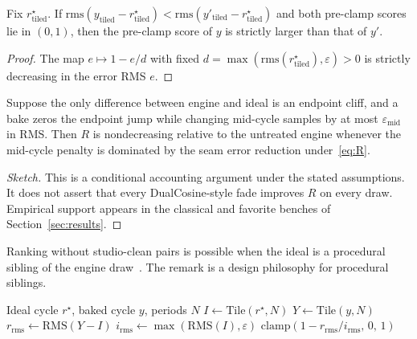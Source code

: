 \begin{proposition}
\label{prop:monotone}
Fix $r^{\star}_{\mathrm{tiled}}$. If $\mathrm{rms}(y_{\mathrm{tiled}}-r^{\star}_{\mathrm{tiled}})<\mathrm{rms}(y'_{\mathrm{tiled}}-r^{\star}_{\mathrm{tiled}})$ and both pre-clamp scores lie in $(0,1)$, then the pre-clamp score of $y$ is strictly larger than that of $y'$.
\end{proposition}
\begin{proof}
The map $e\mapsto 1-e/d$ with fixed $d=\max(\mathrm{rms}(r^{\star}_{\mathrm{tiled}}),\varepsilon)>0$ is strictly decreasing in the error RMS $e$.
\end{proof}

\begin{lemma}
\label{lem:wrap}
Suppose the only difference between engine and ideal is an endpoint cliff, and a bake zeros the endpoint jump while changing mid-cycle samples by at most $\varepsilon_{\mathrm{mid}}$ in RMS.
Then $R$ is nondecreasing relative to the untreated engine whenever the mid-cycle penalty is dominated by the seam error reduction under~\eqref{eq:R}.
\end{lemma}
\begin{proof}[Sketch]
This is a conditional accounting argument under the stated assumptions.
It does not assert that every DualCosine-style fade improves $R$ on every draw.
Empirical support appears in the classical and favorite benches of Section~\ref{sec:results}.
\end{proof}

\begin{remark}
\label{rem:n2n}
Ranking without studio-clean pairs is possible when the ideal is a procedural sibling of the engine draw~\cite{lehtinen2018,kashyap2021n2n}.
The remark is a design philosophy for procedural siblings.
\end{remark}

\begin{algorithm}[t]
\caption{ResidualScore}
\label{alg:residual}
\begin{algorithmic}[1]
\Require Ideal cycle $r^{\star}$, baked cycle $y$, periods $N$
\State $I \gets \mathrm{Tile}(r^{\star}, N)$
\State $Y \gets \mathrm{Tile}(y, N)$
\State $r_{\mathrm{rms}} \gets \mathrm{RMS}(Y-I)$
\State $i_{\mathrm{rms}} \gets \max(\mathrm{RMS}(I), \varepsilon)$
\State \Return $\mathrm{clamp}(1 - r_{\mathrm{rms}}/i_{\mathrm{rms}},\,0,\,1)$
\end{algorithmic}
\end{algorithm}


